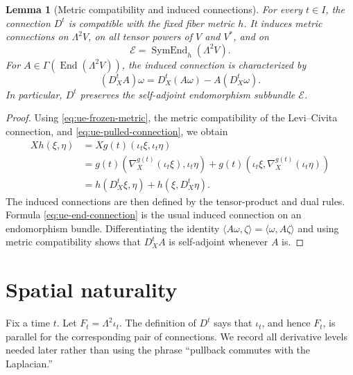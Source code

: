 \documentclass[10pt]{coll-l}
\newtheorem{lemma}[theorem]{Lemma}
\theoremstyle{definition}
\theoremstyle{remark}
\numberwithin{section}{chapter}
\numberwithin{equation}{chapter}
\begin{document}
\begin{lemma}[Metric compatibility and induced connections]
\label{lem:ue-connection-compatible}
For every $t\in I$, the connection $D^t$ is compatible with the fixed
fiber metric $h$.  It induces metric connections on $\Lambda^2V$, on all
tensor powers of $V$ and $V^*$, and on
\[
             \mathcal E=\operatorname{SymEnd}_h(\Lambda^2V).
\]
For $A\in\Gamma(\operatorname{End}(\Lambda^2V))$, the induced connection
is characterized by
\begin{equation}
       (D_X^tA)\omega
          =D_X^t(A\omega)-A(D_X^t\omega).                \label{eq:ue-end-connection}
\end{equation}
In particular, $D^t$ preserves the self-adjoint endomorphism subbundle
$\mathcal E$.
\end{lemma}

\begin{proof}
Using \eqref{eq:ue-frozen-metric}, the metric compatibility of the
Levi--Civita connection, and \eqref{eq:ue-pulled-connection}, we obtain
\begin{align*}
 Xh(\xi,\eta)
 &=Xg(t)(\iota_t\xi,\iota_t\eta)\\
 &=g(t)(\nabla_X^{g(t)}(\iota_t\xi),\iota_t\eta)
   +g(t)(\iota_t\xi,\nabla_X^{g(t)}(\iota_t\eta))\\
 &=h(D_X^t\xi,\eta)+h(\xi,D_X^t\eta).
\end{align*}
The induced connections are then defined by the tensor-product and dual
rules.  Formula \eqref{eq:ue-end-connection} is the usual induced
connection on an endomorphism bundle.  Differentiating the identity
$\langle A\omega,\zeta\rangle=\langle\omega,A\zeta\rangle$ and using metric
compatibility shows that $D_X^tA$ is self-adjoint whenever $A$ is.
\end{proof}

\section{Spatial naturality}
\label{sec:ue-naturality}

Fix a time $t$.  Let $F_t=\Lambda^2\iota_t$.  The definition of $D^t$ says
that $\iota_t$, and hence $F_t$, is parallel for the corresponding pair of
connections.  We record all derivative levels needed later rather than
using the phrase ``pullback commutes with the Laplacian.''
\end{document}
